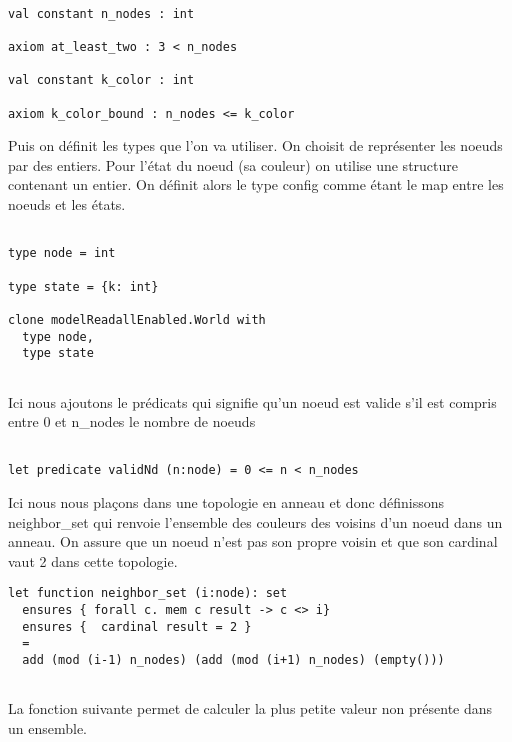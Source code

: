 \documentclass[11pt]{article}
\begin{document}
\lstset{language=why3,label= ,caption= ,captionpos=b,numbers=none}
\begin{lstlisting}

val constant n_nodes : int

axiom at_least_two : 3 < n_nodes

val constant k_color : int

axiom k_color_bound : n_nodes <= k_color

\end{lstlisting}
Puis on définit les types que l'on va utiliser. 
On choisit de représenter les noeuds par des entiers.
Pour l'état du noeud (sa couleur) on utilise une structure contenant un entier.
On définit alors le type config comme étant le map entre les noeuds et les états.


\lstset{language=why3,label= ,caption= ,captionpos=b,numbers=none}
\begin{lstlisting}

type node = int

type state = {k: int}

clone modelReadallEnabled.World with
  type node,
  type state


\end{lstlisting}
Ici nous ajoutons le prédicats qui signifie qu'un noeud est valide s'il est compris entre 0 et n\_nodes le nombre de noeuds
\lstset{language=why3,label= ,caption= ,captionpos=b,numbers=none}
\begin{lstlisting}

let predicate validNd (n:node) = 0 <= n < n_nodes

\end{lstlisting}

Ici nous nous plaçons dans une topologie en anneau et donc définissons neighbor\_set qui renvoie l'ensemble des couleurs des voisins d'un 
noeud dans un anneau. 
On assure que un noeud n'est pas son propre voisin et que son cardinal vaut 2 dans cette topologie.

\lstset{language=why3,label= ,caption= ,captionpos=b,numbers=none}
\begin{lstlisting}
let function neighbor_set (i:node): set
  ensures { forall c. mem c result -> c <> i}
  ensures {  cardinal result = 2 } 
  =
  add (mod (i-1) n_nodes) (add (mod (i+1) n_nodes) (empty()))


\end{lstlisting}


La fonction suivante permet de calculer la plus petite valeur non présente dans un ensemble. 
\end{document}
